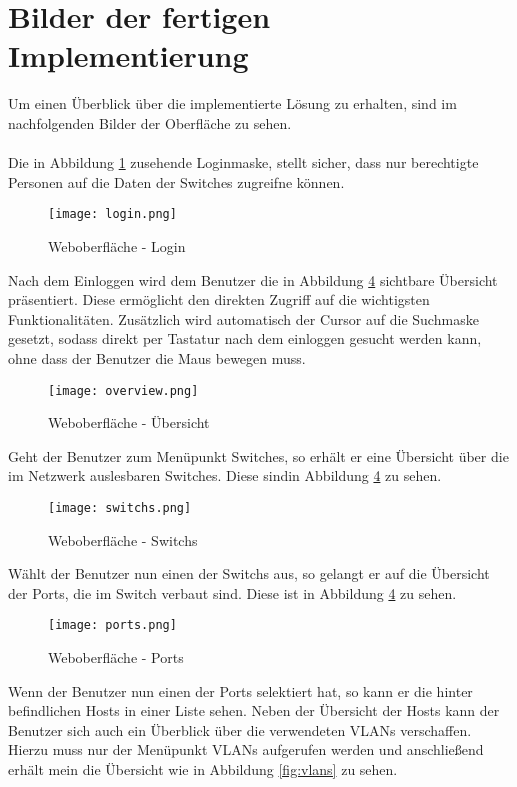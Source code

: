 \section*{Bilder der fertigen Implementierung}
\label{sec:impimgs}

Um einen Überblick über die implementierte Lösung zu erhalten, sind im nachfolgenden Bilder der Oberfläche zu sehen.\\\\
Die in Abbildung \ref{fig:login} zusehende Loginmaske, stellt sicher, dass nur berechtigte Personen auf die Daten der Switches zugreifne können.


\begin{figure}[H]
\centering
\texttt{[image: login.png]}
\caption[]{Weboberfläche - Login}
\label{fig:login}
\end{figure}

Nach dem Einloggen wird dem Benutzer die in Abbildung \ref{fig:overview} sichtbare Übersicht präsentiert.
Diese ermöglicht den direkten Zugriff auf die wichtigsten Funktionalitäten.
Zusätzlich wird automatisch der Cursor auf die Suchmaske gesetzt, sodass direkt per Tastatur nach dem einloggen gesucht werden kann, ohne dass der Benutzer die Maus bewegen muss.

\begin{figure}[H]
\centering
\texttt{[image: overview.png]}
\caption[]{Weboberfläche - Übersicht}
\label{fig:overview}
\end{figure}

Geht der Benutzer zum Menüpunkt Switches, so erhält er eine Übersicht über die im Netzwerk auslesbaren Switches.
Diese sindin Abbildung \ref{fig:overview} zu sehen.

\begin{figure}[H]
\centering
\texttt{[image: switchs.png]}
\caption[]{Weboberfläche - Switchs}
\label{fig:overview}
\end{figure}

Wählt der Benutzer nun einen der Switchs aus, so gelangt er auf die Übersicht der Ports, die im Switch verbaut sind.
Diese ist in Abbildung \ref{fig:overview} zu sehen.

\begin{figure}[H]
\centering
\texttt{[image: ports.png]}
\caption[]{Weboberfläche - Ports}
\label{fig:overview}
\end{figure}

Wenn der Benutzer nun einen der Ports selektiert hat, so kann er die hinter befindlichen Hosts in einer Liste sehen.
Neben der Übersicht der Hosts kann der Benutzer sich auch ein Überblick über die verwendeten VLANs verschaffen.
Hierzu muss nur der Menüpunkt VLANs aufgerufen werden und anschließend erhält mein die Übersicht wie in Abbildung \ref{fig:vlans} zu sehen.

